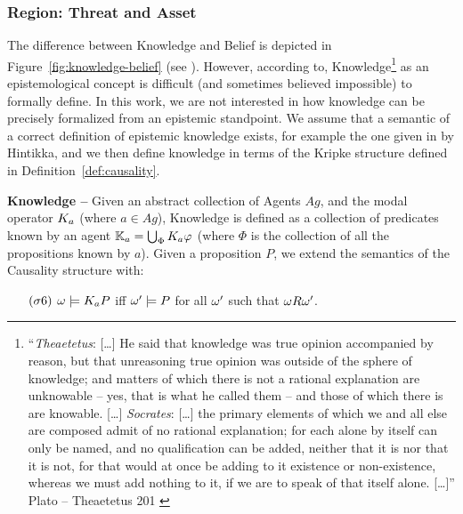 \subsubsection{Region: Threat and Asset}\label{sec:threatasset}
The difference between Knowledge and Belief is depicted in
Figure~\ref{fig:knowledge-belief} (see \autocite{wiki-knowledgebelief}).  However,
according to\autocite{Gettier2012knowledge},
Knowledge\footnote{``\emph{Theaetetus}: [\ldots] He said that knowledge was
true opinion accompanied by reason, but that unreasoning true opinion was
outside of the sphere of knowledge; and matters of which there is not a
rational explanation are unknowable -- yes, that is what he called them -- and
those of which there is are knowable. [\ldots] \emph{Socrates}: [\ldots] the
primary elements of which we and all else are composed admit of no rational
explanation; for each alone by itself can only be named, and no qualification
can be added, neither that it is nor that it is not, for that would at once be
adding to it existence or non-existence, whereas we must add nothing to it, if
we are to speak of that itself alone.  [\ldots]'' Plato -- Theaetetus 201
\autocite{Plato1914Plato}} as an epistemological concept is difficult (and
sometimes believed impossible\autocite{citation}) to formally define. In this
work, we are not interested in 
how knowledge can be precisely formalized from an epistemic standpoint. 
We assume that a semantic of a correct definition of epistemic knowledge exists,
for example the one given in\autocite{Hintikka1962knwoledge} by Hintikka, and we then define 
knowledge in terms of the Kripke structure defined in Definition~\ref{def:causality}.

\begin{definition}{\bf Knowledge --}\label{def:knowledge}
Given an abstract collection of Agents $Ag$, and the modal operator
	$K_{a}$ (where $a\in Ag$), Knowledge is defined as a collection
	of predicates known by an agent $\mathbb{K}_{a}=\bigcup_\Phi K_{a}\varphi$ 
	(where $\Phi$ is the collection of all the propositions known by $a$).
	Given a proposition $P$, we extend the semantics of the Causality structure with:
	\begin{enumerate}[noitemsep]
		\item[$(\sigma6)$] $\omega\models K_{a}P$ iff
			$\omega'\models P$ for all $\omega'$ such that
			$\omega R\omega'$.
	\end{enumerate}
\end{definition}

